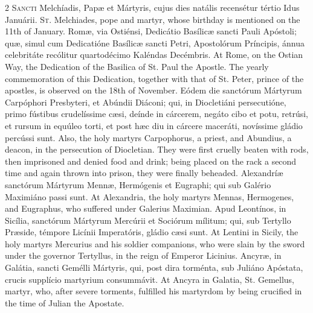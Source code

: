 \begin{paracol}{2}
\lettrine[lines=2]{S}{ancti} Melchíadis, Papæ 
 et Mártyris, cujus dies natális recensétur tértio Idus Januárii.
\switchcolumn
{}
\lettrine[lines=2]{S}{t.} Melchiades, pope and martyr, 
 whose birthday is mentioned on the 11th of January.
\switchcolumn*
{}
Romæ, via Ostiénsi, 
 Dedicátio Basílicæ sancti Pauli Apóstoli; quæ, simul cum Dedicatióne 
 Basílicæ sancti Petri, Apostolórum Príncipis, ánnua celebritáte recólitur 
 quartodécimo Kaléndas Decémbris.
\switchcolumn
{}
At Rome, on the Ostian Way, the 
 Dedication of the Basilica of St. Paul the Apostle. The yearly 
 commemoration of this Dedication, together with that of St. Peter, prince of 
 the apostles, is observed on the 18th of November.
\switchcolumn*
{}
Eódem die sanctórum 
 Mártyrum Carpóphori Presbyteri, et Abúndii Diáconi; qui, in Diocletiáni 
 persecutióne, primo fústibus crudelíssime cæsi, deínde in cárcerem, negáto 
 cibo et potu, retrúsi, et rursum in equúleo torti, et post hæc diu in cárcere maceráti, novíssime gládio percússi sunt.
\switchcolumn
{}
Also, the holy martyrs Carpophorus, 
 a priest, and Abundius, a deacon, in the persecution of Diocletian. 
 They were first cruelly beaten with rods, then imprisoned and denied food 
 and drink; being placed on the rack a second time and again thrown into 
 prison, they were finally beheaded.
\switchcolumn*
{}
Alexandríæ sanctórum 
 Mártyrum Mennæ, Hermógenis et Eugraphi; qui sub Galério Maximiáno passi sunt.
\switchcolumn
{}
At Alexandria, the holy martyrs 
 Mennas, Hermogenes, and Eugraphus, who suffered under Galerius Maximian.
\switchcolumn*
{}
Apud Leontínos, in 
 Sicília, sanctórum Mártyrum Mercúrii et Sociórum mílitum; qui, sub Tertyllo 
 Præside, témpore Licínii Imperatóris, gládio cæsi sunt.
\switchcolumn
{}
At Lentini in Sicily, the holy 
 martyrs Mercurius and his soldier companions, who were slain by the sword 
 under the governor Tertyllus, in the reign of Emperor Licinius.
\switchcolumn*
{}
Ancyræ, in Galátia, sancti Gemélli Mártyris, qui, post dira torménta, sub Juliáno Apóstata, 
 crucis supplício martyrium consummávit.
\switchcolumn
{}
At Ancyra in Galatia, St. Gemellus, 
 martyr, who, after severe torments, fulfilled his martyrdom by being 
 crucified in the time of Julian the Apostate.
\switchcolumn*
{}

\end{paracol}
